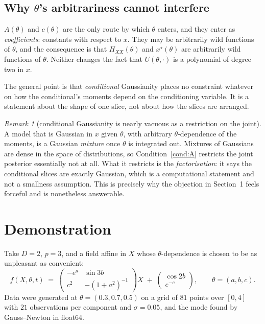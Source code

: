 \documentclass[11pt]{article}
\newcommand{\Hxx}{H_{\!X\!X}}
\newcommand{\xstar}{x^{\star}}
\theoremstyle{plain}
\theoremstyle{definition}
\theoremstyle{remark}
\newtheorem{remark}{Remark}
\begin{document}
\subsection{Why $\theta$'s arbitrariness cannot interfere}

$A(\theta)$ and $c(\theta)$ are the only route by which $\theta$ enters, and they enter as
\emph{coefficients}: constants with respect to $x$. They may be arbitrarily wild functions of
$\theta$, and the consequence is that $\Hxx(\theta)$ and $\xstar(\theta)$ are arbitrarily wild
functions of $\theta$. Neither changes the fact that $U(\theta,\cdot)$ is a polynomial of degree
two in $x$.

The general point is that \emph{conditional} Gaussianity places no constraint whatever on how the
conditional's moments depend on the conditioning variable. It is a statement about the shape of one
slice, not about how the slices are arranged.

\begin{remark}[conditional Gaussianity is nearly vacuous as a restriction on the joint]
A model that is Gaussian in $x$ given $\theta$, with arbitrary $\theta$-dependence of the moments,
is a Gaussian \emph{mixture} once $\theta$ is integrated out. Mixtures of Gaussians are dense in
the space of distributions, so Condition~\ref{cond:A} restricts the joint posterior essentially not
at all. What it restricts is the \emph{factorisation}: it says the conditional slices are exactly
Gaussian, which is a computational statement and not a smallness assumption. This is precisely why
the objection in Section~1 feels forceful and is nonetheless answerable.
\end{remark}

\section{Demonstration}
\label{sec:demo}

Take $D = 2$, $p = 3$, and a field affine in $X$ whose $\theta$-dependence is chosen to be as
unpleasant as convenient:
\begin{equation}
\label{eq:demofield}
  f(X, \theta, t) \;=\;
  \begin{pmatrix} -e^{a} & \sin 3b \\ c^{2} & -(1+a^{2})^{-1} \end{pmatrix} X
  \;+\; \begin{pmatrix} \cos 2b \\ e^{-c} \end{pmatrix},
  \qquad \theta = (a,b,c).
\end{equation}
Data were generated at $\theta = (0.3, 0.7, 0.5)$ on a grid of $81$ points over $[0,4]$ with $21$
observations per component and $\sigma = 0.05$, and the mode found by Gauss--Newton in float64.
\end{document}
